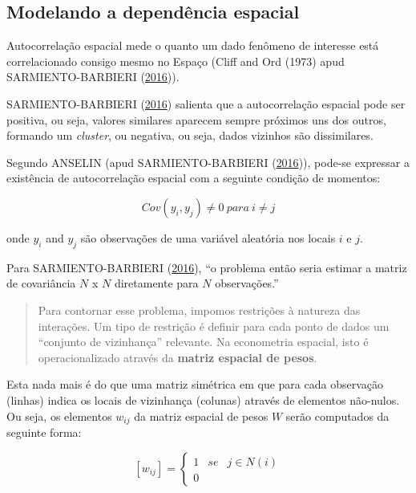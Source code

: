 \documentclass[12pt,]{article}
\begin{document}
\subsection{Modelando a dependência
espacial}\label{modelando-a-dependencia-espacial}

Autocorrelação espacial mede o quanto um dado fenômeno de interesse está
correlacionado consigo mesmo no Espaço (Cliff and Ord (1973) apud
SARMIENTO-BARBIERI (\protect\hyperlink{ref-sarmiento-barbieri}{2016})).

SARMIENTO-BARBIERI (\protect\hyperlink{ref-sarmiento-barbieri}{2016})
salienta que a autocorrelação espacial pode ser positiva, ou seja,
valores similares aparecem sempre próximos uns dos outros, formando um
\emph{cluster}, ou negativa, ou seja, dados vizinhos são dissimilares.

Segundo ANSELIN (apud SARMIENTO-BARBIERI
(\protect\hyperlink{ref-sarmiento-barbieri}{2016})), pode-se expressar a
existência de autocorrelação espacial com a seguinte condição de
momentos:

\begin{equation}
  \label{eq-cov}
  Cov(y_i,y_j) \neq  0\ para\ i \neq  j
\end{equation}

onde \(y_i\) and \(y_j\) são observações de uma variável aleatória nos
locais \(i\) e \(j\).

Para SARMIENTO-BARBIERI
(\protect\hyperlink{ref-sarmiento-barbieri}{2016}), ``o problema então
seria estimar a matriz de covariância \(N\) x \(N\) diretamente para
\(N\) observações.''

\begin{quote}
Para contornar esse problema, impomos restrições à natureza das
interações. Um tipo de restrição é definir para cada ponto de dados um
``conjunto de vizinhança'' relevante. Na econometria espacial, isto é
operacionalizado através da \textbf{matriz espacial de pesos}.
\end{quote}

Esta nada mais é do que uma matriz simétrica em que para cada observação
(linhas) indica os locais de vizinhança (colunas) através de elementos
não-nulos. Ou seja, os elementos \(w_{ij}\) da matriz espacial de pesos
\(W\) serão computados da seguinte forma:

\begin{equation}
  \label{eq-W}
  [w_{ij}] = \left\{\begin{matrix}
  1 & se & j \in N(i)\\ 
  0 & 
\end{matrix}\right.
\end{equation}
\end{document}
